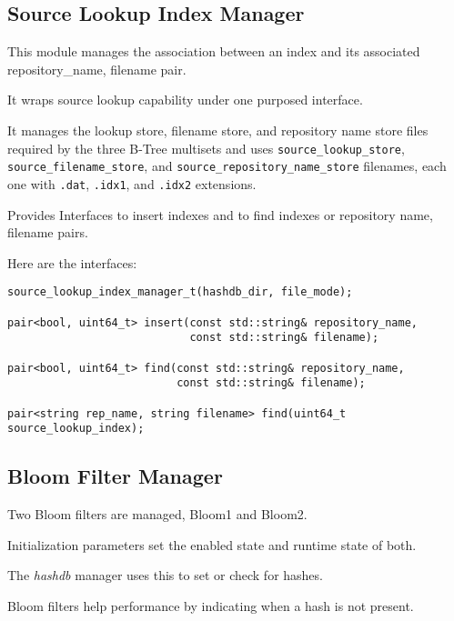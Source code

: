 \documentclass[12pt,twoside]{article}
\newcommand{\hdb}{\emph{hashdb}\xspace}
\begin{document}
\subsection{Source Lookup Index Manager}
This module manages the association between an index
and its associated repository\_name, filename pair.
\begin{compactitem}
\item It wraps source lookup capability under one purposed interface.
\item It manages the lookup store, filename store,
and repository name store files required by the three B-Tree multisets
and uses
\texttt{source\_lookup\_store},
\texttt{source\_filename\_store}, and
\texttt{source\_repository\_name\_store}
filenames, each one with
\texttt{.dat}, \texttt{.idx1}, and \texttt{.idx2} extensions.
\item Provides Interfaces to insert indexes
and to find indexes or repository name, filename pairs.
\end{compactitem}

Here are the interfaces:

\begin{small}
\begin{verbatim}
source_lookup_index_manager_t(hashdb_dir, file_mode);

pair<bool, uint64_t> insert(const std::string& repository_name,
                            const std::string& filename);

pair<bool, uint64_t> find(const std::string& repository_name,
                          const std::string& filename);

pair<string rep_name, string filename> find(uint64_t source_lookup_index);
\end{verbatim}
\end{small}

\subsection{Bloom Filter Manager}
\begin{compactitem}
\item Two Bloom filters are managed, Bloom1 and Bloom2.
\item Initialization parameters set the enabled state and runtime state of both.
\item The \hdb manager uses this to set or check for hashes.
\item Bloom filters help performance by indicating when a hash is not present.
\end{compactitem}
\end{document}
